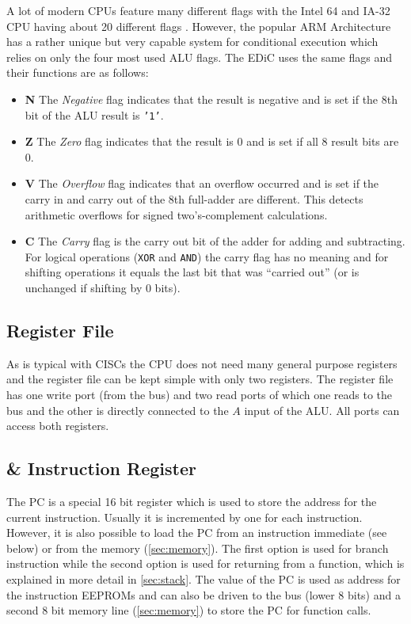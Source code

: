 A lot of modern \glspl{CPU} feature many different flags with the Intel 64\textsuperscript{\textregistered} and IA-32 \gls{CPU} having about 20 different flags \cite[Section~3.4.3]{intelx86}.
However, the popular ARM Architecture has a rather unique but very capable system for conditional execution which relies on only the four most used \gls{ALU} flags.
The \gls{EDiC} uses the same flags and their functions are as follows:
\begin{itemize}
  \item \textbf{N} The \emph{Negative} flag indicates that the result is negative and is set if the 8th bit of the \gls{ALU} result is \texttt{'1'}.
  \item \textbf{Z} The \emph{Zero} flag indicates that the result is 0 and is set if all 8 result bits are 0.
  \item \textbf{V} The \emph{Overflow} flag indicates that an overflow occurred and is set if the carry in and carry out of the 8th full-adder are different.
  This detects arithmetic overflows for signed two's-complement calculations.
  \item \textbf{C} The \emph{Carry} flag is the carry out bit of the adder for adding and subtracting.
  For logical operations (\texttt{XOR} and \texttt{AND}) the carry flag has no meaning and for shifting operations it equals the last bit that was ``carried out'' (or is unchanged if shifting by 0 bits).
\end{itemize}
\subsection{Register File}\label{sec:regs}
As is typical with \glspl{CISC} the \gls{CPU} does not need many general purpose registers and the register file can be kept simple with only two registers.
The register file has one write port (from the bus) and two read ports of which one reads to the bus and the other is directly connected to the $A$ input of the \gls{ALU}.
All ports can access both registers.
\subsection{ \& Instruction Register}
The \gls{PC} is a special 16 bit register which is used to store the address for the current instruction.
Usually it is incremented by one for each instruction.
However, it is also possible to load the \gls{PC} from an instruction immediate (see below) or from the memory (\cref{sec:memory}).
The first option is used for branch instruction while the second option is used for returning from a function, which is explained in more detail in \cref{sec:stack}.
The value of the \gls{PC} is used as address for the instruction \glspl{EEPROM} and can also be driven to the bus (lower 8 bits) and a second 8 bit memory line (\cref{sec:memory}) to store the \gls{PC} for function calls.


